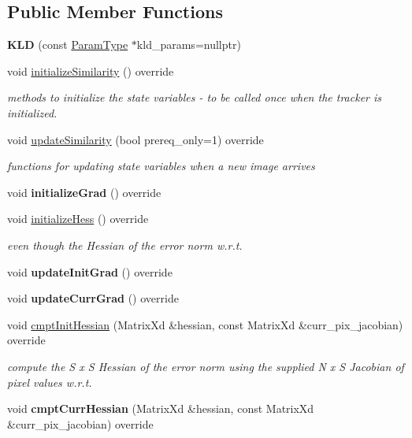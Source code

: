 \subsection*{Public Member Functions}
\begin{DoxyCompactItemize}
\item 
\hypertarget{classKLD_a87476df9d6b0baa4d67dab95b75e9814}{{\bfseries K\-L\-D} (const \hyperlink{structKLDParams}{Param\-Type} $\ast$kld\-\_\-params=nullptr)}\label{classKLD_a87476df9d6b0baa4d67dab95b75e9814}

\item 
void \hyperlink{classKLD_a0086dc5d8b48e01c053090e667cacdad}{initialize\-Similarity} () override
\begin{DoxyCompactList}\small\item\em methods to initialize the state variables -\/ to be called once when the tracker is initialized. \end{DoxyCompactList}\item 
void \hyperlink{classKLD_a303fabab01458afed9364cca944eb028}{update\-Similarity} (bool prereq\-\_\-only=1) override
\begin{DoxyCompactList}\small\item\em functions for updating state variables when a new image arrives \end{DoxyCompactList}\item 
\hypertarget{classKLD_a6ce8c73142017d3b53075cf0774275cf}{void {\bfseries initialize\-Grad} () override}\label{classKLD_a6ce8c73142017d3b53075cf0774275cf}

\item 
void \hyperlink{classKLD_adc93f2d2e4a33bfed44c34cfcf839fc1}{initialize\-Hess} () override
\begin{DoxyCompactList}\small\item\em even though the Hessian of the error norm w.\-r.\-t. \end{DoxyCompactList}\item 
\hypertarget{classKLD_a522b0a98c822a705ca1b2dcfa9e3e192}{void {\bfseries update\-Init\-Grad} () override}\label{classKLD_a522b0a98c822a705ca1b2dcfa9e3e192}

\item 
\hypertarget{classKLD_a4debf27190e1df08bf168602007a43b2}{void {\bfseries update\-Curr\-Grad} () override}\label{classKLD_a4debf27190e1df08bf168602007a43b2}

\item 
void \hyperlink{classKLD_a3cabba5f44910411c3df473906406ea6}{cmpt\-Init\-Hessian} (Matrix\-Xd \&hessian, const Matrix\-Xd \&curr\-\_\-pix\-\_\-jacobian) override
\begin{DoxyCompactList}\small\item\em compute the S x S Hessian of the error norm using the supplied N x S Jacobian of pixel values w.\-r.\-t. \end{DoxyCompactList}\item 
\hypertarget{classKLD_ad7ac185b46c27ee3a868812ddef29754}{void {\bfseries cmpt\-Curr\-Hessian} (Matrix\-Xd \&hessian, const Matrix\-Xd \&curr\-\_\-pix\-\_\-jacobian) override}\label{classKLD_ad7ac185b46c27ee3a868812ddef29754}


\end{DoxyCompactItemize}
